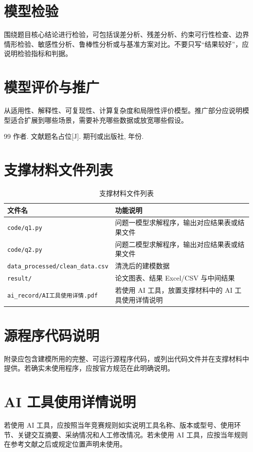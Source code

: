 \documentclass[withoutpreface,bwprint]{cumcmthesis}
\newif\ifuserefbib
\begin{document}
\section{模型检验}
围绕题目核心结论进行检验，可包括误差分析、残差分析、约束可行性检查、边界情形检验、敏感性分析、鲁棒性分析或与基准方案对比。不要只写“结果较好”，应说明检验指标和判据。

\section{模型评价与推广}
从适用性、解释性、可复现性、计算复杂度和局限性评价模型。推广部分应说明模型适合扩展到哪些场景，需要补充哪些数据或放宽哪些假设。

\ifuserefbib
\nocite{placeholder-ref}


\else
\begin{thebibliography}{99}
 作者. 文献题名占位[J]. 期刊或出版社, 年份.
\end{thebibliography}
\fi

\appendix
\section{支撑材料文件列表}
\begin{table}[H]
\centering
\caption{支撑材料文件列表}
\begin{tabularx}{\textwidth}{lX}
\toprule
文件名 & 功能说明 \\
\midrule
\texttt{code/q1.py} & 问题一模型求解程序，输出对应结果表或结果文件 \\
\texttt{code/q2.py} & 问题二模型求解程序，输出对应结果表或结果文件 \\
\texttt{data\_processed/clean\_data.csv} & 清洗后的建模数据 \\
\texttt{result/} & 论文图表、结果 Excel/CSV 与中间结果 \\
\texttt{ai\_record/AI工具使用详情.pdf} & 若使用 AI 工具，放置支撑材料中的 AI 工具使用详情说明 \\
\bottomrule
\end{tabularx}
\end{table}

\section{源程序代码说明}
附录应包含建模所用的完整、可运行源程序代码，或列出代码文件并在支撑材料中提供。若确实未使用程序，应按官方规范在此明确说明。

\section{AI 工具使用详情说明}
若使用 AI 工具，应按照当年竞赛规则如实说明工具名称、版本或型号、使用环节、关键交互摘要、采纳情况和人工修改情况。若未使用 AI 工具，应按当年规则在参考文献之后或规定位置声明未使用。
\end{document}
